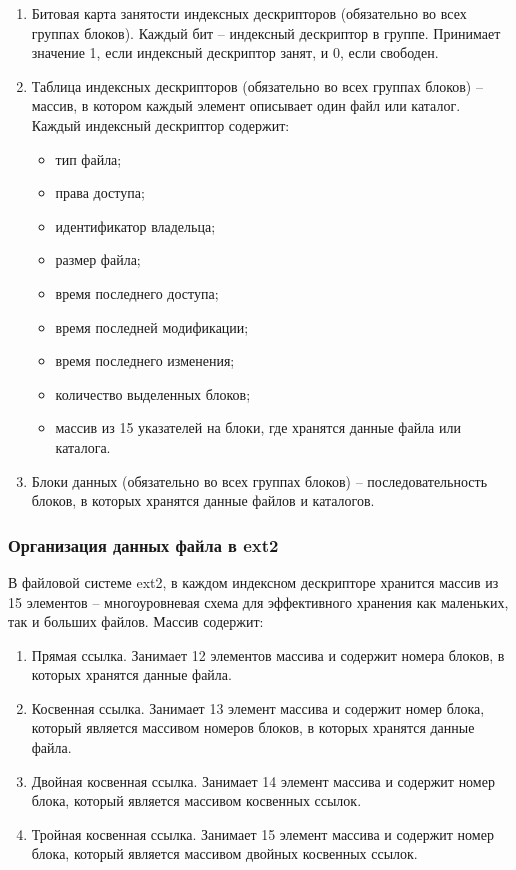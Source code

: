 \begin{enumerate}
\item Битовая карта занятости индексных дескрипторов (обязательно во всех группах блоков). Каждый бит -- индексный дескриптор в группе. Принимает значение 1, если индексный дескриптор занят, и 0, если свободен.
\item Таблица индексных дескрипторов (обязательно во всех группах блоков) -- массив, в котором каждый элемент описывает один файл или каталог.
Каждый индексный дескриптор содержит:
\begin{itemize}
\item тип файла;
\item права доступа;
\item идентификатор владельца;
\item размер файла;
\item время последнего доступа;
\item время последней модификации;
\item время последнего изменения;
\item количество выделенных блоков;
\item массив из 15 указателей на блоки, где хранятся данные файла или каталога.
\end{itemize}
\item Блоки данных (обязательно во всех группах блоков) -- последовательность блоков, в которых хранятся данные файлов и каталогов.
\end{enumerate}

\subsubsection{Организация данных файла в ext2}

В файловой системе ext2, в каждом индексном дескрипторе хранится массив из 15 элементов -- многоуровневая схема для эффективного хранения как маленьких, так и больших файлов.
Массив содержит:
\begin{enumerate}
\item Прямая ссылка. Занимает 12 элементов массива и содержит номера блоков, в которых хранятся данные файла.
\item Косвенная ссылка. Занимает 13 элемент массива и содержит номер блока, который является массивом номеров блоков, в которых хранятся данные файла.
\item Двойная косвенная ссылка. Занимает 14 элемент массива и содержит номер блока, который является массивом косвенных ссылок.
\item Тройная косвенная ссылка. Занимает 15 элемент массива и содержит номер блока, который является массивом двойных косвенных ссылок.
\end{enumerate}

